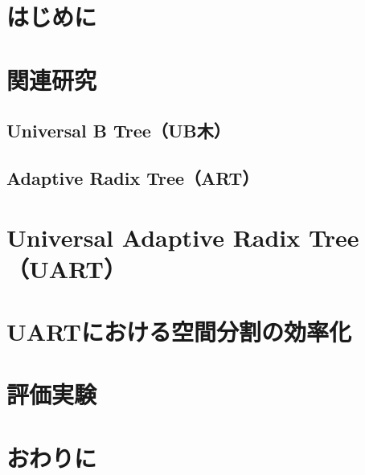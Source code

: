 
\section{はじめに}






\section{関連研究}

\subsection{Universal B Tree（UB木）}


\subsection{Adaptive Radix Tree（ART）}






\section{Universal Adaptive Radix Tree（UART）}






\section{UARTにおける空間分割の効率化}






\section{評価実験}






\section{おわりに}





